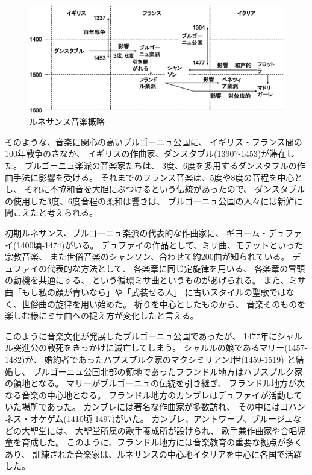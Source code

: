 \documentclass[a4j]{jarticle}
\begin{document}
\begin{figure}[tb]
 \begin{center}
  \includegraphics[width=\hsize]{fig/renaissance_summary.eps}
  \caption{ルネサンス音楽概略}
  \label{fig:renaissance_summary}
 \end{center}
\end{figure}

そのような、音楽に関心の高いブルゴーニュ公国に、
イギリス・フランス間の100年戦争のさなか、
イギリスの作曲家、ダンスタブル(1390?-1453)が滞在した。
ブルゴーニュ楽派の音楽家たちは、
3度、6度を多用するダンスタブルの作曲手法に影響を受ける。
それまでのフランス音楽は、5度や8度の音程を中心とし、
それに不協和音を大胆にぶつけるという伝統があったので、
ダンスタブルの使用した3度、6度音程の柔和は響きは、
ブルゴーニュ公国の人々には新鮮に聞こえたと考えられる。

初期ルネサンス、ブルゴーニュ楽派の代表的な作曲家に、
ギヨーム・デュファイ(1400頃-1474)がいる。
デュファイの作品として、ミサ曲、モテットといった宗教音楽、
また世俗音楽のシャンソン、合わせて約200曲が知られている。
デュファイの代表的な方法として、
各楽章に同じ定旋律を用いる、
各楽章の冒頭の動機を共通にする、
という循環ミサ曲というものがあげられる。
また、ミサ曲「もし私の顔が青いなら」や「武装せる人」
に古いスタイルの聖歌ではなく、世俗曲の旋律を用い始めた。
祈りを中心としたものから、
音楽そのものを楽しむ様にミサ曲への捉え方が変化したと言える。

このように音楽文化が発展したブルゴーニュ公国であったが、
1477年にシャルル突進公の戦死をきっかけに滅亡してしまう。
シャルルの娘であるマリー(1457-1482)が、
婚約者であったハプスブルク家のマクシミリアンI世(1459-1519)
と結婚し、
ブルゴーニュ公国北部の領地であったフランドル地方はハプスブルク家の領地となる。
マリーがブルゴーニュの伝統を引き継ぎ、
フランドル地方が次なる音楽の中心地となる。
フランドル地方のカンブレはデュファイが活動していた場所であった。
カンブレには著名な作曲家が多数訪れ、
その中にはヨハンネス・オケゲム(1410頃-1497)がいた。
カンブレ、アントワープ、ブルージュなどの大聖堂には、
大聖堂所属の歌手養成所が設けられ、
歌手兼作曲家や合唱児童を育成した。
このように、フランドル地方には音楽教育の重要な拠点が多くあり、
訓練された音楽家は、ルネサンスの中心地イタリアを中心に各国で活躍した。
\end{document}
